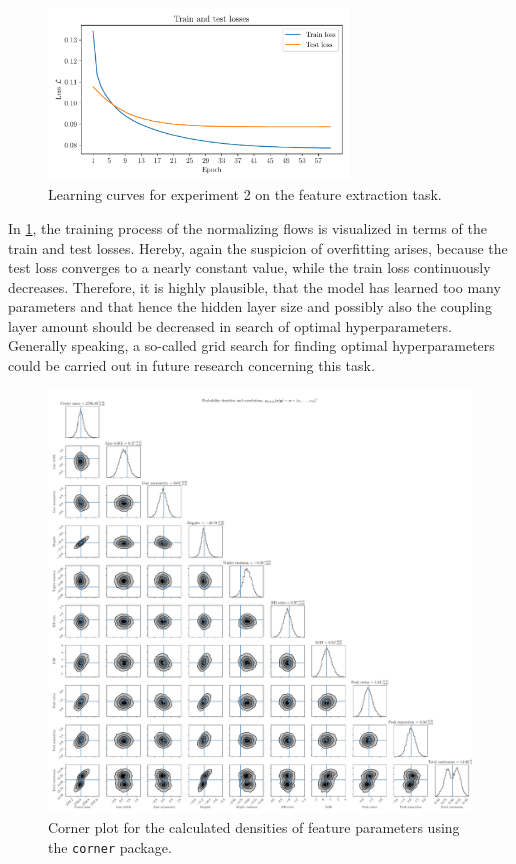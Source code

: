 \documentclass[a4paper,12pt]{report}
\begin{document}
\begin{figure}[h!]
\centering
\includegraphics[width=8cm]{figures/nf-feature-extraction-example-2-loss.pdf}
\caption{Learning curves for experiment 2 on the feature extraction task.}
\label{fig:nf-feature-extraction-example-2-loss}
\end{figure}
In \cref{fig:nf-feature-extraction-example-2-loss}, the training process of the normalizing flows is visualized in terms of the train and test losses. Hereby, again the suspicion of overfitting arises, because the test loss converges to a nearly constant value, while the train loss continuously decreases. Therefore, it is highly plausible, that the model has learned too many parameters and that hence the hidden layer size and possibly also the coupling layer amount should be decreased in search of optimal hyperparameters. Generally speaking, a so-called grid search for finding optimal hyperparameters could be carried out in future research concerning this task.

\begin{figure}[h!]
\centering
\includegraphics[width=\textwidth]{figures/nf-feature-extraction-example-2-corner.pdf}
\cprotect\caption{Corner plot for the calculated densities of feature parameters using the \verb|corner| package.}
\label{fig:nf-feature-extraction-example-2-corner}
\end{figure}
\end{document}
